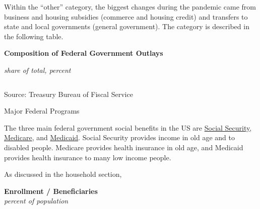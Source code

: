 \documentclass{report}
\begin{document}
{\begin{minipage}{1.0\textwidth}
Within the ``other'' category, the biggest changes during the pandemic came from business and housing subsidies (commerce and housing credit) and transfers to state and local governments (general government). The category is described in the following table. 
\vspace{1mm}

\normalsize \textbf{Composition of Federal Government Outlays}\\
\footnotesize{\textit{share of total, percent}
\vspace*{-4mm}

 \setlength{\tabcolsep}{1.2pt} \color{black!90}
{\renewcommand{\arraystretch}{1.55}
\hspace*{-2mm} \begin{tabular}{p{58mm} R{9.0mm} R{9.0mm} R{9.0mm} R{9.0mm} R{9.0mm} R{9.0mm}}
		 \hline
	\end{tabular}
}}
		
\vspace{-2mm}
\footnotesize{Source: Treasury Bureau of Fiscal Service}
\end{minipage}
\newpage
\begin{minipage}{1.0\textwidth}      
\normalsize Major Federal Programs
\vspace{-1mm}

\small The three main federal government social benefits in the US are \href{https://www.ssa.gov/about-ssa}{Social Security}, \href{https://www.medicare.gov/what-medicare-covers/your-medicare-coverage-choices/whats-medicare}{Medicare}, and \href{https://www.medicaid.gov/medicaid/index.html}{Medicaid}. Social Security provides income in old age and to disabled people. Medicare provides health insurance in old age, and Medicaid provides health insurance to many low income people. 

As discussed in the household section,  
\end{minipage}
\vspace{1mm}

\begin{minipage}{0.36\textwidth}
\normalsize \textbf{Enrollment / Beneficiaries}\\
\footnotesize{\textit{percent of population}}
\vspace{4.05cm}


\end{minipage}}
\end{document}
